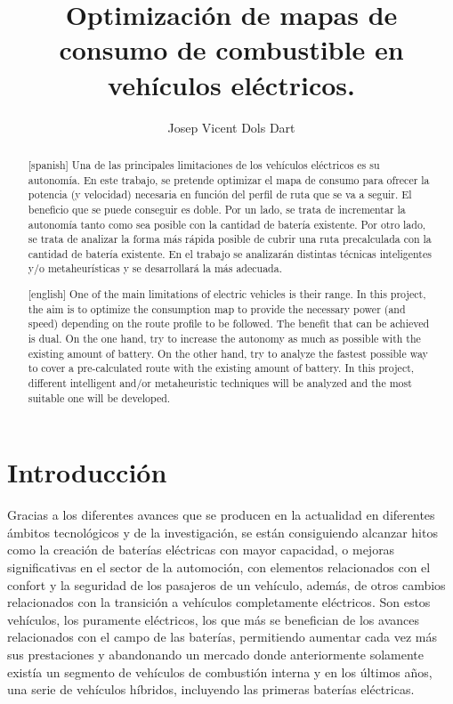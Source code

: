 \documentclass[11pt,spanish,listoffigures,listoftables]{tfgetsinf}
\title{Optimización de mapas de consumo de combustible en vehículos eléctricos.}
\author{Josep Vicent Dols Dart}
\begin{document}
	\lstset{language=Python, frame=none}

\begin{abstract}[spanish]
Una de las principales limitaciones de los vehículos eléctricos es su autonomía. En este trabajo, se pretende optimizar el mapa de consumo para ofrecer la potencia (y velocidad) necesaria en función del perfil de ruta que se va a seguir. El beneficio que se puede conseguir es doble. Por un lado, se trata de incrementar la autonomía tanto como sea posible con la cantidad de batería existente. Por otro lado, se trata de analizar la forma más rápida posible de cubrir una ruta precalculada con la cantidad de batería existente. En el trabajo se analizarán distintas técnicas inteligentes y/o metaheurísticas y se desarrollará la más adecuada.
\end{abstract}

\begin{abstract}[english]
One of the main limitations of electric vehicles is their range. In this project, the aim is to optimize the consumption map to provide the necessary power (and speed) depending on the route profile to be followed. The benefit that can be achieved is dual. On the one hand, try to increase the autonomy as much as possible with the existing amount of battery. On the other hand, try to analyze the fastest possible way to cover a pre-calculated route with the existing amount of battery. In this project, different intelligent and/or metaheuristic techniques will be analyzed and the most suitable one will be developed.
\end{abstract}

\mainmatter


\chapter{Introducción}
Gracias a los diferentes avances que se producen en la actualidad en diferentes ámbitos tecnológicos y de la investigación, se están consiguiendo alcanzar hitos como la creación de baterías eléctricas con mayor capacidad, o mejoras significativas en el sector de la automoción, con elementos relacionados con el confort y la seguridad de los pasajeros de un vehículo, además, de otros cambios relacionados con la transición a vehículos completamente eléctricos. Son estos vehículos, los puramente eléctricos, los que más se benefician de los avances relacionados con el campo de las baterías, permitiendo aumentar cada vez más sus prestaciones y abandonando un mercado donde anteriormente solamente existía un segmento de vehículos de combustión interna y en los últimos años, una serie de vehículos híbridos, incluyendo las primeras baterías eléctricas.
\end{document}

